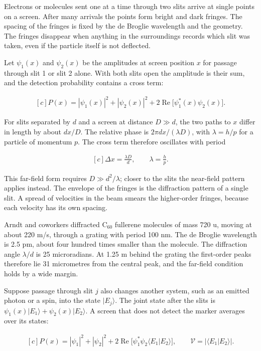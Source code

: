 \documentclass[11pt,oneside]{book}
\newenvironment{centeredalign}{\[\begin{gathered}[c]}{\end{gathered}\]}
\newcommand{\ket}[1]{\lvert #1\rangle}
\begin{document}
Electrons or molecules sent one at a time through two slits arrive at single points on a screen. After many arrivals the points form bright and dark fringes. The spacing of the fringes is fixed by the de Broglie wavelength and the geometry. The fringes disappear when anything in the surroundings records which slit was taken, even if the particle itself is not deflected.

Let \(\psi_1(x)\) and \(\psi_2(x)\) be the amplitudes at screen position \(x\) for passage through slit 1 or slit 2 alone. With both slits open the amplitude is their sum, and the detection probability contains a cross term:

\begin{centeredalign}
P(x)=|\psi_1(x)|^2+|\psi_2(x)|^2+2\operatorname{Re}\big[\psi_1^*(x)\psi_2(x)\big].
\end{centeredalign}

For slits separated by \(d\) and a screen at distance \(D\gg d\), the two paths to \(x\) differ in length by about \(dx/D\). The relative phase is \(2\pi dx/(\lambda D)\), with \(\lambda=h/p\) for a particle of momentum \(p\). The cross term therefore oscillates with period

\begin{centeredalign}
\Delta x=\frac{\lambda D}{d},\qquad \lambda=\frac{h}{p}.
\end{centeredalign}

This far-field form requires \(D\gg d^2/\lambda\); closer to the slits the near-field pattern applies instead. The envelope of the fringes is the diffraction pattern of a single slit. A spread of velocities in the beam smears the higher-order fringes, because each velocity has its own spacing.

Arndt and coworkers diffracted C\(_{60}\) fullerene molecules of mass 720 u, moving at about 220 m/s, through a grating with period 100 nm. The de Broglie wavelength is 2.5 pm, about four hundred times smaller than the molecule. The diffraction angle \(\lambda/d\) is 25 microradians. At 1.25 m behind the grating the first-order peaks therefore lie 31 micrometres from the central peak, and the far-field condition holds by a wide margin.

Suppose passage through slit \(j\) also changes another system, such as an emitted photon or a spin, into the state \(\ket{E_j}\). The joint state after the slits is \(\psi_1(x)\ket{E_1}+\psi_2(x)\ket{E_2}\). A screen that does not detect the marker averages over its states:

\begin{centeredalign}
P(x)=|\psi_1|^2+|\psi_2|^2+2\operatorname{Re}\big[\psi_1^*\psi_2\langle E_1|E_2\rangle\big],
\qquad \mathcal V=|\langle E_1|E_2\rangle|.
\end{centeredalign}
\end{document}
